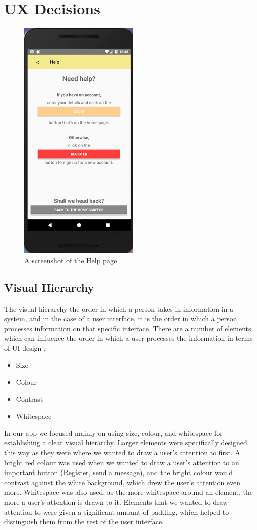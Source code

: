\documentclass[a4paper, 11pt]{article}
\begin{document}
\section{UX Decisions} 
\begin{figure}
\centering
\includegraphics{hierarchy.png}
\caption{A screenshot of the Help page}
\end{figure}
\subsection{Visual Hierarchy}

The visual hierarchy the order in which a person takes in information in a system, and in the case of a user interface, it is the order in which a person processes information on that specific interface. There are a number of elements which can influence the order in which a user processes the information in terms of UI design \cite{hierarchy}.

\begin{itemize}
	\item{Size}
	\item{Colour}
	\item{Contrast}
	\item{Whitespace}
\end{itemize}

In our app we focused mainly on using size, colour, and whitespace for establishing a clear visual hierarchy. Larger elements were specifically designed this way as they were where we wanted to draw a user's attention to first. A bright red colour was used when we wanted to draw a user's attention to an important button (Register, send a message), and the bright colour would contrast against the white background, which drew the user's attention even more. Whitespace was also used, as the more whitespace around an element, the more a user's attention is drawn to it. Elements that we wanted to draw attention to were given a significant amount of padding, which helped to distinguish them from the rest of the user interface.
\end{document}
